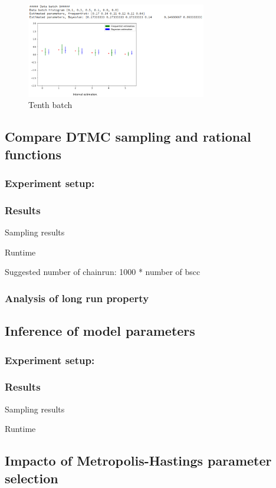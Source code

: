 \documentclass[12pt]{article}
\theoremstyle{definition}
\begin{document}
\begin{figure}[H]
  \centering
  \includegraphics[width=0.7\textwidth,keepaspectratio]{figures/ex1_4.png}
  \caption{Tenth batch}
\end{figure}

\subsection{Compare DTMC sampling and rational functions}
\subsubsection{Experiment setup:}

\subsubsection{Results}
Sampling results

Runtime


Suggested number of chainrun: 1000 * number of bscc

\subsubsection{Analysis of long run property}


\subsection{Inference of model parameters}
\subsubsection{Experiment setup:}

\subsubsection{Results}
Sampling results

Runtime

\subsection{Impacto of Metropolis-Hastings parameter selection}
\end{document}
